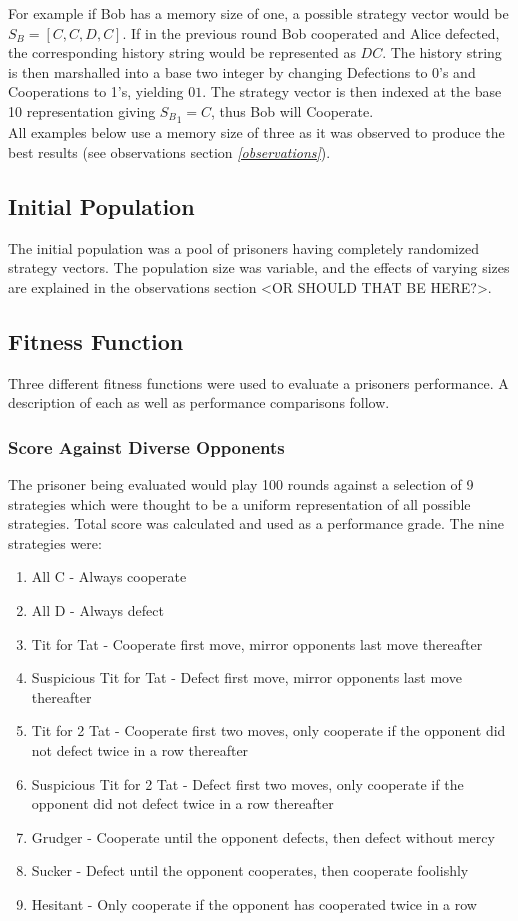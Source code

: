 \documentclass[12pt]{article}
\begin{document}
For example if Bob has
a memory size of one, a possible strategy vector would be
$S_B = [C, C, D, C]$.  If in the previous round Bob cooperated and Alice defected,
the corresponding history string would be represented as $DC$.
The history string is then
marshalled into a base two integer by changing Defections to 0's and Cooperations
to 1's, yielding $01$.  The strategy vector is then indexed at the base
10 representation giving ${S_B}_1 = C$, thus Bob will Cooperate. \\

All examples below use a memory size of three as it was observed to produce the
best results (see observations section \textit{\ref{observations}}).

\subsection{Initial Population}
The initial population was a pool of prisoners having completely randomized
strategy vectors.  The population size was variable, and the effects of varying
sizes are explained in the observations section <OR SHOULD THAT BE HERE?>.

\subsection{Fitness Function}

Three different fitness functions were used to evaluate a prisoners performance.
A description of each as well as performance comparisons follow.

\pagebreak
\subsubsection{Score Against Diverse Opponents}
The prisoner being evaluated would play 100 rounds against a selection of 9
strategies which were thought to be a uniform representation of all possible
strategies.  Total score was calculated and used as a performance grade.
The nine strategies were:
\begin{enumerate}
    \item All C - Always cooperate
    \item All D - Always defect
    \item Tit for Tat - Cooperate first move, mirror opponents last move thereafter
    \item Suspicious Tit for Tat - Defect first move, mirror opponents last move
        thereafter
    \item Tit for 2 Tat - Cooperate first two moves, only cooperate if the
        opponent did not defect twice in a row thereafter
    \item Suspicious Tit for 2 Tat - Defect first two moves, only cooperate if the
        opponent did not defect twice in a row thereafter
    \item Grudger - Cooperate until the opponent defects, then defect without mercy
    \item Sucker - Defect until the opponent cooperates, then cooperate foolishly
    \item Hesitant - Only cooperate if the opponent has cooperated twice in a row
\end{enumerate}
\end{document}
